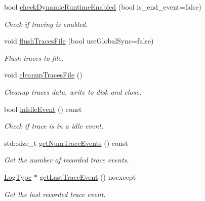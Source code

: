 \begin{DoxyCompactItemize}
bool \hyperlink{structvt_1_1trace_1_1_trace_lite_a8c80920e23cef1aeedbb2282fb6769f2}{check\+Dynamic\+Runtime\+Enabled} (bool is\+\_\+end\+\_\+event=false)
\begin{DoxyCompactList}\small\item\em Check if tracing is enabled. \end{DoxyCompactList}\item 
void \hyperlink{structvt_1_1trace_1_1_trace_lite_a31513ed82d3b3c74369fde81491eb3a2}{flush\+Traces\+File} (bool use\+Global\+Sync=false)
\begin{DoxyCompactList}\small\item\em Flush traces to file. \end{DoxyCompactList}\item 
void \hyperlink{structvt_1_1trace_1_1_trace_lite_ac412f235b5e5b4510d848fa0b3b6a539}{cleanup\+Traces\+File} ()
\begin{DoxyCompactList}\small\item\em Cleanup traces data, write to disk and close. \end{DoxyCompactList}\item 
bool \hyperlink{structvt_1_1trace_1_1_trace_lite_ad3b81920d008e46dff0eb205ca99bd22}{in\+Idle\+Event} () const
\begin{DoxyCompactList}\small\item\em Check if trace is in a idle event. \end{DoxyCompactList}\item 
std\+::size\+\_\+t \hyperlink{structvt_1_1trace_1_1_trace_lite_a01b746338f535ac1df0566f9705e2d1e}{get\+Num\+Trace\+Events} () const
\begin{DoxyCompactList}\small\item\em Get the number of recorded trace events. \end{DoxyCompactList}\item 
\hyperlink{structvt_1_1trace_1_1_trace_lite_aeb73e523d31829d3163c877b145afa2a}{Log\+Type} $\ast$ \hyperlink{structvt_1_1trace_1_1_trace_lite_aec2c076296efcabc54dfdb02de932837}{get\+Last\+Trace\+Event} () noexcept
\begin{DoxyCompactList}\small\item\em Get the last recorded trace event. \end{DoxyCompactList}\end{DoxyCompactItemize}
